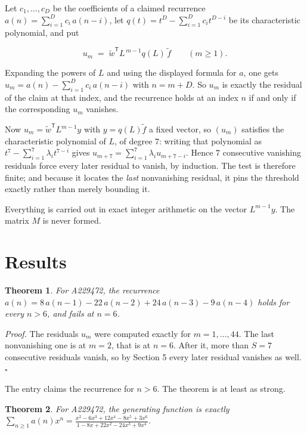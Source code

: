 \documentclass[11pt]{article}
\newtheorem{theorem}{Theorem}
\theoremstyle{definition}
\begin{document}
Let $c_1,\dots,c_D$ be the coefficients of a claimed recurrence $a(n) = \sum_{i=1}^{D} c_i\,a(n-i)$, let $q(t) = t^{D} - \sum_{i=1}^{D} c_i t^{D-i}$ be its characteristic polynomial, and put

\[u_m \;=\; \tilde w^{\mathsf T} L^{\,m-1} q(L)\,\tilde f \qquad (m \ge 1).\]

Expanding the powers of $L$ and using the displayed formula for $a$, one gets $u_m = a(n) - \sum_{i=1}^{D} c_i\,a(n-i)$ with $n = m + D$. So $u_m$ is exactly the residual of the claim at that index, and the recurrence holds at an index $n$ if and only if the corresponding $u_m$ vanishes.

Now $u_m = \tilde w^{\mathsf T} L^{m-1} y$ with $y = q(L)\tilde f$ a fixed vector, so $(u_m)$ satisfies the characteristic polynomial of $L$, of degree $7$: writing that polynomial as $t^{7} - \sum_{i=1}^{7} \lambda_i t^{7-i}$ gives $u_{m+7} = \sum_{i=1}^{7} \lambda_i u_{m+7-i}$. Hence $7$ consecutive vanishing residuals force every later residual to vanish, by induction. The test is therefore finite; and because it locates the {\itshape last} nonvanishing residual, it pins the threshold exactly rather than merely bounding it.

Everything is carried out in exact integer arithmetic on the vector $L^{m-1}y$. The matrix $M$ is never formed.

\section{Results}

\begin{theorem} For A229472, the recurrence $a(n) = 8\,a(n-1) - 22\,a(n-2) + 24\,a(n-3) - 9\,a(n-4)$ holds for every $n > 6$, and fails at $n = 6$.\end{theorem}

{\itshape Proof.} The residuals $u_m$ were computed exactly for $m = 1,\dots,44$. The last nonvanishing one is at $m = 2$, that is at $n = 6$. After it, more than $S = 7$ consecutive residuals vanish, so by Section 5 every later residual vanishes as well. $\square$

The entry claims the recurrence for $n > 6$. The theorem is at least as strong.

\begin{theorem} For A229472, the generating function is exactly $\sum_{n\ge 1} a(n)x^n = \frac{x^{2} - 6x^{3} + 12x^{4} - 8x^{5} + 3x^{6}}{1 - 8x + 22x^{2} - 24x^{3} + 9x^{4}}$.\end{theorem}
\end{document}
